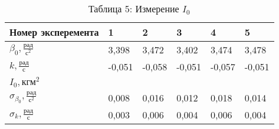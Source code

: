 \begin{table}[h!]
	\begin{center}
		\caption*{\color[HTML]{000000}Таблица 5: Измерение $I_0$}
		\begin{tabular}{|P{3.8cm}|P{1.3cm}|P{1.3cm}|P{1.3cm}|P{1.3cm}|P{1.3cm}|}
			\hline
            Номер эксперемента&1&2&3&4&5\\
            \hline
            $\beta_0, \frac{\text{рад}}{\text{с}^2}$&3,398&3,472&3,402&3,474&3,478\\
            \hline
            $k, \frac{\text{рад}}{\text{с}}$ &-0,051&-0,058&-0,051&-0,057&-0,051\\
            \hline
            $I_{0}, \text{кгм}^2$ &&&&&\\
			\hline
            $\sigma_{\beta_0}, \frac{\text{рад}}{\text{с}^2}$&0,008&0,016&0,012&0,018&0,014\\
            \hline
            $\sigma_{k}, \frac{\text{рад}}{\text{с}}$&0,003&0,006&0,004&0,006&0,004\\
			\hline
		\end{tabular}
	\end{center}
\end{table}